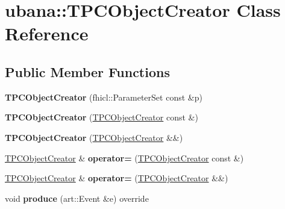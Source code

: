\hypertarget{classubana_1_1TPCObjectCreator}{\section{ubana\-:\-:\-T\-P\-C\-Object\-Creator \-Class \-Reference}
\label{classubana_1_1TPCObjectCreator}
}
\subsection*{\-Public \-Member \-Functions}
\begin{DoxyCompactItemize}
\item 
\hypertarget{classubana_1_1TPCObjectCreator_a3ede084ea7a48736a7cfda7f6427e69a}{{\bfseries \-T\-P\-C\-Object\-Creator} (fhicl\-::\-Parameter\-Set const \&p)}\label{classubana_1_1TPCObjectCreator_a3ede084ea7a48736a7cfda7f6427e69a}

\item 
\hypertarget{classubana_1_1TPCObjectCreator_a1714c62a985e1444fa8f71e366967822}{{\bfseries \-T\-P\-C\-Object\-Creator} (\hyperlink{classubana_1_1TPCObjectCreator}{\-T\-P\-C\-Object\-Creator} const \&)}\label{classubana_1_1TPCObjectCreator_a1714c62a985e1444fa8f71e366967822}

\item 
\hypertarget{classubana_1_1TPCObjectCreator_ab72456b04b7764b9e6318170e7396774}{{\bfseries \-T\-P\-C\-Object\-Creator} (\hyperlink{classubana_1_1TPCObjectCreator}{\-T\-P\-C\-Object\-Creator} \&\&)}\label{classubana_1_1TPCObjectCreator_ab72456b04b7764b9e6318170e7396774}

\item 
\hypertarget{classubana_1_1TPCObjectCreator_a4e80649783497441049d5c7eba4eb43d}{\hyperlink{classubana_1_1TPCObjectCreator}{\-T\-P\-C\-Object\-Creator} \& {\bfseries operator=} (\hyperlink{classubana_1_1TPCObjectCreator}{\-T\-P\-C\-Object\-Creator} const \&)}\label{classubana_1_1TPCObjectCreator_a4e80649783497441049d5c7eba4eb43d}

\item 
\hypertarget{classubana_1_1TPCObjectCreator_a9cc24e5787ea61fac5454166a602d018}{\hyperlink{classubana_1_1TPCObjectCreator}{\-T\-P\-C\-Object\-Creator} \& {\bfseries operator=} (\hyperlink{classubana_1_1TPCObjectCreator}{\-T\-P\-C\-Object\-Creator} \&\&)}\label{classubana_1_1TPCObjectCreator_a9cc24e5787ea61fac5454166a602d018}

\item 
\hypertarget{classubana_1_1TPCObjectCreator_ac0732a1801ba70412d127ecd4dac5398}{void {\bfseries produce} (art\-::\-Event \&e) override}\label{classubana_1_1TPCObjectCreator_ac0732a1801ba70412d127ecd4dac5398}


\end{DoxyCompactItemize}
